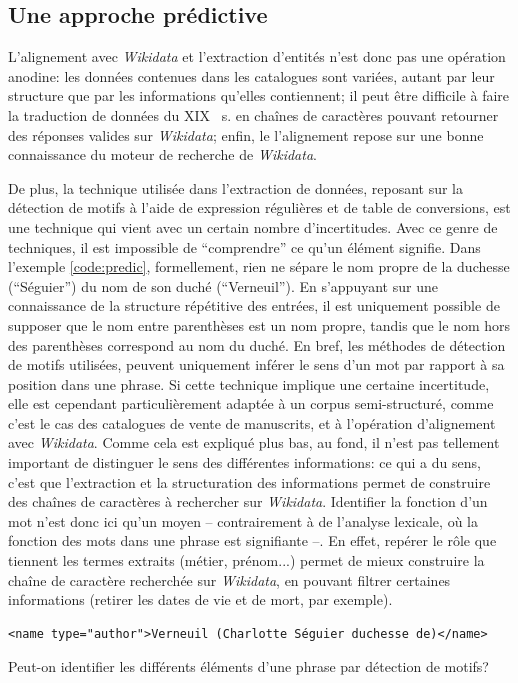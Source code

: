 \documentclass[a4paper, 12pt, twoside]{book}
\newenvironment{code}{\captionsetup{type=listing}}{}
\newcommand{\scl}[1]{%
	#1%
	\ifthenelse{\equal{#1}{I}}{\up{er}}{\up{ème}}%
	~s.%
}
\newcommand{\wkd}{\textit{Wikidata}}
\begin{document}
\subsection{Une approche prédictive}
L'alignement avec \wkd{} et l'extraction d'entités n'est donc pas une opération anodine: les données contenues dans les catalogues sont variées, autant par leur structure que par les informations qu'elles contiennent; il peut être difficile à faire la traduction de données du \scl{XIX} en chaînes de caractères pouvant retourner des réponses valides sur \wkd{}; enfin, le l'alignement repose sur une bonne connaissance du moteur de recherche de \wkd{}. 

De plus, la technique utilisée dans l'extraction de données, reposant sur la détection de motifs à l'aide de \glspl{expression régulière} et de \glspl{table de conversion}, est une technique qui vient avec un certain nombre d'incertitudes. Avec ce genre de techniques, il est impossible de \enquote{comprendre} ce qu'un élément signifie. Dans l'exemple \ref{code:predic}, formellement, rien ne sépare le nom propre de la duchesse (\enquote{Séguier}) du nom de son duché (\enquote{Verneuil}). En s'appuyant sur une connaissance de la structure répétitive des entrées, il est uniquement possible de supposer que le nom entre parenthèses est un nom propre, tandis que le nom hors des parenthèses correspond au nom du duché. En bref, les méthodes de détection de motifs utilisées, peuvent uniquement inférer le sens d'un mot par rapport à sa position dans une phrase. Si cette technique implique une certaine incertitude, elle est cependant particulièrement adaptée à un corpus semi-structuré, comme c'est le cas des catalogues de vente de manuscrits, et à l'opération d'alignement avec \wkd{}. Comme cela est expliqué plus bas, au fond, il n'est pas tellement important de distinguer le sens des différentes informations: ce qui a du sens, c'est que l'extraction et la structuration des informations permet de construire des chaînes de caractères à rechercher sur \wkd{}. Identifier la fonction d'un mot n'est donc ici qu'un moyen -- contrairement à de l'analyse lexicale, où la fonction des mots dans une phrase est signifiante --. En effet, repérer le rôle que tiennent les termes extraits (métier, prénom...) permet de mieux construire la chaîne de caractère recherchée sur \wkd{}, en pouvant filtrer certaines informations (retirer les dates de vie et de mort, par exemple).

\begin{code}
	\begin{verbatim}
<name type="author">Verneuil (Charlotte Séguier duchesse de)</name>
	\end{verbatim}
	\label{code:predic}
	\caption{Peut-on identifier les différents éléments d'une phrase par détection de motifs?}
\end{code}
\end{document}
